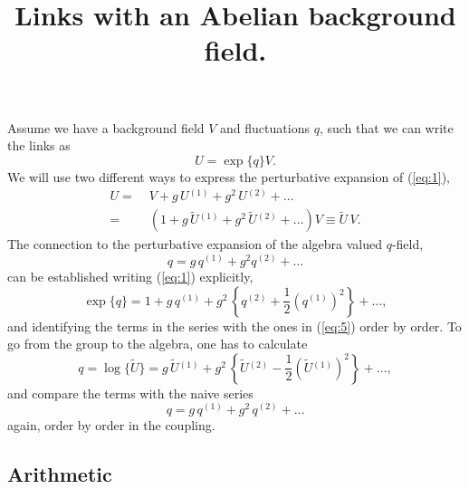 \documentclass[a4paper]{scrartcl}
\title{Links with an Abelian background field.}
\newcommand{\ord}[1]{\ensuremath{^{(#1)}}}
\begin{document}
\maketitle

Assume we have a background field $V$ and fluctuations $q$, such that
we can write the links as
%
\begin{equation}
  \label{eq:1}
  U = \exp\{q\} V.
\end{equation}
%
We will use two different ways to express the perturbative expansion
of (\ref{eq:1}),
%
\begin{align}
  \label{eq:3}
  U =&\; V + g\, U\ord 1 + g^2\, U\ord 2 + \ldots\\
  \label{eq:5}
    =&\; \left (
      1 + g\, \tilde U\ord 1 + g^2\, \tilde U\ord 2 + \ldots
      \right) V \equiv \tilde U \,V.
\end{align}
%
The connection to the perturbative expansion of the algebra
valued $q$-field,
%
\begin{equation}
  \label{eq:2}
  q = g\, q\ord 1 + g^2 q \ord 2 + \ldots
\end{equation}
%
can be established writing (\ref{eq:1}) explicitly,
%
\begin{equation}
  \label{eq:4}
  \exp \{ q \} = 1 + g \, q \ord 1 + g^2\, \left\{
    q \ord 2 + \frac 1 2 \left(q\ord 1\right)^2 \right\}
   + \ldots,
\end{equation}
%
and identifying the terms in the series with the ones in
(\ref{eq:5}) order by order. To go from the group to the algebra, one
has to calculate
%
\begin{equation}
  \label{eq:6}
  q = \log\{\tilde U\} = g\, \tilde U \ord 1 + g^2 \, \left\{
    \tilde U \ord 2 - \frac 1 2 \left( \tilde U \ord 1 \right)^2
    \right \} + \ldots,
\end{equation}
%
and compare the terms with the naive series
%
\begin{equation}
  \label{eq:7}
  q = g\,q\ord 1 + g^2 \,q\ord 2 + \ldots
\end{equation}
%
again, order by order in the coupling.

\subsection*{Arithmetic}
\label{sec:arithmetic}
\end{document}
